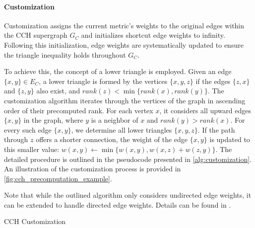 \paragraph{Customization}

Customization assigns the current metric's weights to the original edges within the CCH supergraph \(G_C\) and initializes shortcut edge weights to infinity. Following this initialization, edge weights are systematically updated to ensure the triangle inequality holds throughout \(G_C\).

To achieve this, the concept of a lower triangle is employed.
Given an edge \(\{x, y\} \in E_C\), a lower triangle is formed by the vertices \(\{x, y, z\}\) if the edges \(\{z, x\}\) and \(\{z, y\}\) also exist, and \(rank(z) < \min\{rank(x), rank(y)\}\).
The customization algorithm iterates through the vertices of the graph in ascending order of their precomputed rank.
For each vertex \(x\), it considers all upward edges \(\{x, y\}\) in the graph, where \(y\) is a neighbor of \(x\) and \(rank(y) > rank(x)\).
For every such edge \(\{x, y\}\), we determine all lower triangles \(\{x, y, z\}\).
If the path through \(z\) offers a shorter connection, the weight of the edge \(\{x, y\}\) is updated to this smaller value: \(w(x, y) \leftarrow \min\{w(x, y), w(x, z) + w(z, y)\}\).
The detailed procedure is outlined in the pseudocode presented in \cref{alg:customization}.
An illustration of the customization process is provided in \cref{fig:cch_precomputation_example}.

Note that while the outlined algorithm only considers undirected edge weights, it can be extended to handle directed edge weights. Details can be found in \cite{dibbelt_customizable_2016}.

\begin{algorithm}
	\BlankLine
	\caption{CCH Customization}
	\label{alg:customization}
\end{algorithm}

